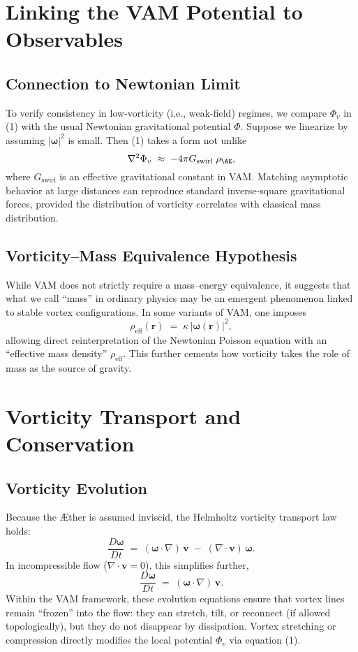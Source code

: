 \documentclass[aps,preprint,superscriptaddress]{revtex4-2}
\begin{document}
    \section{Linking the VAM Potential to Observables}

    \subsection{Connection to Newtonian Limit}

    To verify consistency in low-vorticity (i.e., weak-field) regimes, we compare \(\Phi_v\) in (1) with the usual Newtonian gravitational potential \(\Phi\). Suppose we linearize by assuming \(\lvert \boldsymbol{\omega} \rvert^2\) is small. Then (1) takes a form not unlike
    \[
        \nabla^2 \Phi_v \;\approx\; -4\pi G_{\mathrm{swirl}}\;\rho_{\mathrm{\AE}},
    \]
    where \(G_{\mathrm{swirl}}\) is an effective gravitational constant in VAM. Matching asymptotic behavior at large distances can reproduce standard inverse-square gravitational forces, provided the distribution of vorticity correlates with classical mass distribution.

    \subsection{Vorticity–Mass Equivalence Hypothesis}

    While VAM does not strictly require a mass–energy equivalence, it suggests that what we call “mass” in ordinary physics may be an emergent phenomenon linked to stable vortex configurations. In some variants of VAM, one imposes
    \[
        \rho_{\mathrm{eff}}(\mathbf{r}) \;=\; \kappa \,\lvert \boldsymbol{\omega}(\mathbf{r}) \rvert^2,
    \]
    allowing direct reinterpretation of the Newtonian Poisson equation with an “effective mass density” \(\rho_{\mathrm{eff}}\). This further cements how vorticity takes the role of mass as the source of gravity.

    \section{Vorticity Transport and Conservation}

    \subsection{Vorticity Evolution}

    Because the Æther is assumed inviscid, the Helmholtz vorticity transport law holds:
    \[
        \frac{D \boldsymbol{\omega}}{Dt}
        \;=\;
        (\boldsymbol{\omega} \cdot \nabla)\,\mathbf{v}
        \;-\;
        (\nabla \cdot \mathbf{v})\,\boldsymbol{\omega}.
    \]
    In incompressible flow (\(\nabla \cdot \mathbf{v} = 0\)), this simplifies further,
    \[
        \frac{D \boldsymbol{\omega}}{Dt}
        \;=\;
        (\boldsymbol{\omega} \cdot \nabla)\,\mathbf{v}.
    \]
    Within the VAM framework, these evolution equations ensure that vortex lines remain “frozen” into the flow: they can stretch, tilt, or reconnect (if allowed topologically), but they do not disappear by dissipation. Vortex stretching or compression directly modifies the local potential \(\Phi_v\) via equation (1).
\end{document}
